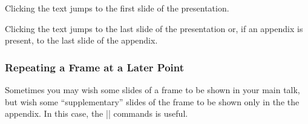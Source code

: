 \begin{command}{\hyperlinkdocumentstart{}}
  Clicking the text jumps to the first slide of the presentation.
\end{command}

\begin{command}{\hyperlinkdocumentend{}}
  Clicking the text jumps to the last slide of the presentation or, if
  an appendix is present, to the last slide of the appendix.
\end{command}




\subsubsection{Repeating a Frame at a Later Point}

Sometimes you may wish some slides of a frame to be shown in your main
talk, but wish some ``supplementary'' slides of the frame to be shown
only in the the appendix. In this case, the |\againframe| commands is
useful. 


